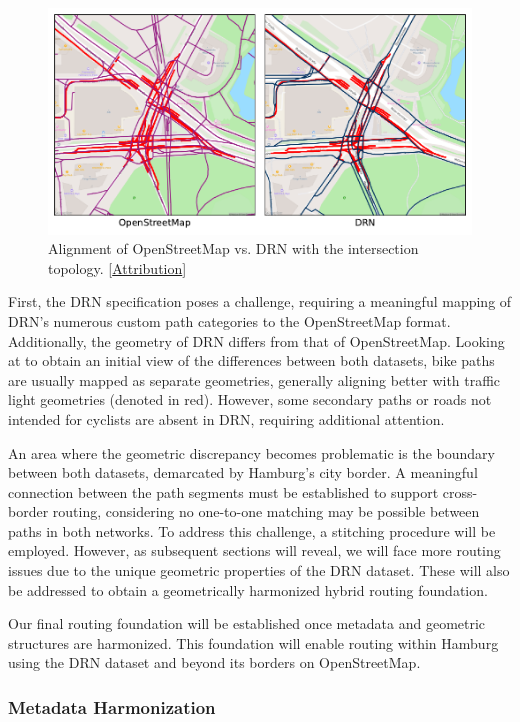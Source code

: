 \begin{figure}[t]
\centering
\includegraphics[width=\linewidth]{images/routing-drn-osm-intersection.pdf}
\caption{Alignment of OpenStreetMap vs. DRN with the intersection topology. [\hyperref[attribution]{Attribution}]}
\label{fig:comparison}
\end{figure}

First, the DRN specification poses a challenge, requiring a meaningful mapping of DRN's numerous custom path categories to the OpenStreetMap format. Additionally, the geometry of DRN differs from that of OpenStreetMap. Looking at  to obtain an initial view of the differences between both datasets, bike paths are usually mapped as separate geometries, generally aligning better with traffic light geometries (denoted in red). However, some secondary paths or roads not intended for cyclists are absent in DRN, requiring additional attention.

An area where the geometric discrepancy becomes problematic is the boundary between both datasets, demarcated by Hamburg's city border. A meaningful connection between the path segments must be established to support cross-border routing, considering no one-to-one matching may be possible between paths in both networks. To address this challenge, a stitching procedure will be employed. However, as subsequent sections will reveal, we will face more routing issues due to the unique geometric properties of the DRN dataset. These will also be addressed to obtain a geometrically harmonized hybrid routing foundation. 

Our final routing foundation will be established once metadata and geometric structures are harmonized. This foundation will enable routing within Hamburg using the DRN dataset and beyond its borders on OpenStreetMap.

\subsubsection{Metadata Harmonization}\label{sec:maxlorenz1}

